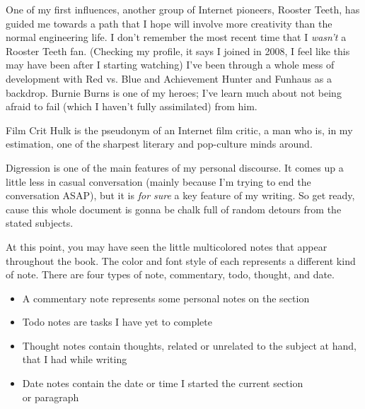 \documentclass[./butidigress.tex]{subfiles}
\begin{document}
One of my first influences, another group of Internet pioneers, Rooster Teeth, has guided me towards a path that I hope will involve more creativity than the normal engineering life.
I don't remember the most recent time that I \emph{wasn't} a Rooster Teeth fan.
(Checking my profile, it says I joined in 2008, I feel like this may have been after I starting watching)
I've been through a whole mess of development with Red vs. Blue and Achievement Hunter and Funhaus as a backdrop.
Burnie Burns is one of my heroes; I've learn much about not being afraid to fail (which I haven't fully assimilated) from him.

Film Crit Hulk is the pseudonym of an Internet film critic, a man who is, in my estimation, one of the sharpest literary and pop-culture minds around.

\label{sec:thetitle}
Digression is one of the main features of my personal discourse.
It comes up a little less in casual conversation (mainly because I'm trying to end the conversation ASAP), but it is \emph{for sure} a key feature of my writing.
So get ready, cause this whole document is gonna be chalk full of random detours from the stated subjects.

At this point, you may have seen the little multicolored notes that appear throughout the book.
The color and font style of each represents a different kind of note.
There are four types of note, commentary, todo, thought, and date.

\begin{itemize}
    \item {\commstyle\textcolor{\commcolor}{A commentary note represents some personal notes on the section}}
    \item {\todostyle\textcolor{\todocolor}{Todo notes are tasks I have yet to complete}}
    \item {\thoughtstyle\textcolor{\thoughtcolor}{Thought notes contain thoughts, related or unrelated to the subject at hand, that I had while writing}}
    \item {\textcolor{\datecolor}{Date notes contain the date or time I started the current section\\ or paragraph}}
\end{itemize}
\end{document}
